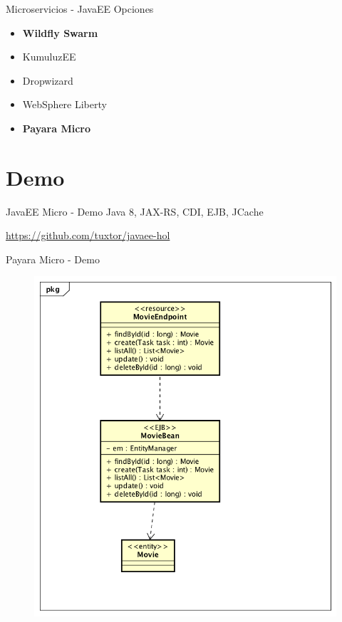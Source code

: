 \documentclass{beamer}
\begin{document}
\begin{frame}{Microservicios - JavaEE}
Opciones
\begin{itemize}
	\item \textbf{Wildfly Swarm}
	\item KumuluzEE
	\item Dropwizard
	\item WebSphere Liberty
	\item \textbf{Payara Micro}
\end{itemize}

\end{frame}

\section{Demo}
\begin{frame}{JavaEE Micro  - Demo}
\huge Java 8, JAX-RS, CDI, EJB, JCache

\normalsize  \url{https://github.com/tuxtor/javaee-hol}
\end{frame}

\begin{frame}{Payara Micro - Demo}
\begin{figure}
	\centering
	\includegraphics[width=0.6\linewidth]{Images/democlass}
\end{figure}
\end{frame}
\end{document}
